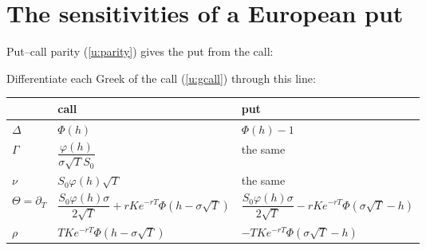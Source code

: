 \section{The sensitivities of a European put}\label{u:gput}
\begin{steps}
\item Put--call parity (\cref{u:parity}) gives the put from the call:
\begin{deriv}
\end{deriv}
\item Differentiate each Greek of the call (\cref{u:gcall}) through this line:
\begin{deriv}
\end{deriv}
\end{steps}

\begin{center}\renewcommand{\arraystretch}{2.1}
\begin{tabular}{@{}l|l|l@{}}
 & call & put\\\hline
$\Delta$ & $\Phi(h)$ & $\Phi(h)-1$\\
$\Gamma$ & $\dfrac{\varphi(h)}{\sigma\sqrt TS_0}$ & the same\\
$\nu$ & $S_0\varphi(h)\sqrt T$ & the same\\
$\Theta=\partial_T$ & $\dfrac{S_0\varphi(h)\sigma}{2\sqrt T}+rKe^{-rT}\Phi(h-\sigma\sqrt T)$ & $\dfrac{S_0\varphi(h)\sigma}{2\sqrt T}-rKe^{-rT}\Phi(\sigma\sqrt T-h)$\\
$\rho$ & $TKe^{-rT}\Phi(h-\sigma\sqrt T)$ & $-TKe^{-rT}\Phi(\sigma\sqrt T-h)$\\
\end{tabular}
\end{center}

